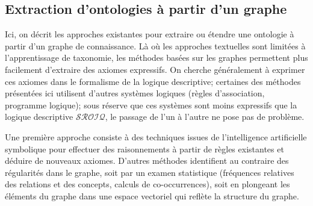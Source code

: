 \subsection{Extraction d'ontologies à partir d'un graphe}
\label{subsec:litt-te-graph}



Ici, on décrit les approches existantes pour extraire ou étendre une ontologie à partir d'un graphe de connaissance. Là où les approches textuelles sont limitées à l'apprentissage de taxonomie, les méthodes basées sur les graphes permettent plus facilement d'extraire des axiomes expressifs. On cherche généralement à exprimer ces axiomes dans le formalisme de la logique descriptive; certaines des méthodes présentées ici utilisent d'autres systèmes logiques (règles d'association, programme logique); sous réserve que ces systèmes sont moins expressifs que la logique descriptive $\mathcal{SROIQ}$, le passage de l'un à l'autre ne pose pas de problème.

Une première approche consiste à des techniques issues de l'intelligence artificielle symbolique pour effectuer des raisonnements à partir de règles existantes et déduire de nouveaux axiomes. D'autres méthodes identifient au contraire des régularités dans le graphe, soit par un examen statistique (fréquences relatives des relations et des concepts, calculs de co-occurrences), soit en plongeant les éléments du graphe dans une espace vectoriel qui reflète la structure du graphe.


